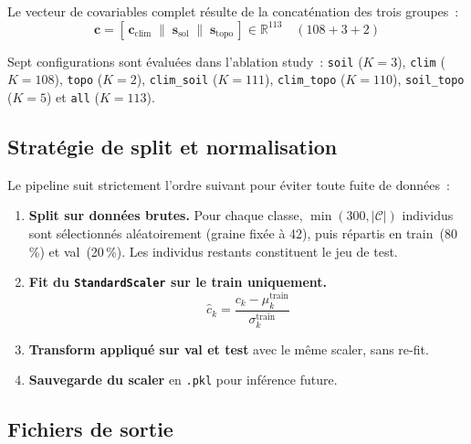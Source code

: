 Le vecteur de covariables complet résulte de la concaténation des trois groupes~:
\[
    \mathbf{c} = \left[\,\mathbf{c}_{\text{clim}} \;\|\; \mathbf{s}_{\text{sol}}
    \;\|\; \mathbf{s}_{\text{topo}}\,\right] \in \mathbb{R}^{113}
    \quad (108 + 3 + 2)
\]

Sept configurations sont évaluées dans l'ablation study~: \texttt{soil} ($K=3$),
\texttt{clim} ($K=108$), \texttt{topo} ($K=2$), \texttt{clim\_soil} ($K=111$),
\texttt{clim\_topo} ($K=110$), \texttt{soil\_topo} ($K=5$) et \texttt{all} ($K=113$).

\subsection{Stratégie de split et normalisation}
\label{sec:split_norm}

Le pipeline suit strictement l'ordre suivant pour éviter toute fuite de données~:

\begin{enumerate}
    \item \textbf{Split sur données brutes.} Pour chaque classe,
    $\min(300, |\mathcal{C}|)$ individus sont sélectionnés aléatoirement (graine fixée
    à 42), puis répartis en train~(80\,\%) et val~(20\,\%). Les individus restants
    constituent le jeu de test.
    \item \textbf{Fit du \texttt{StandardScaler} sur le train uniquement.}
    \[
        \hat{c}_k = \frac{c_k - \mu_k^{\text{train}}}{\sigma_k^{\text{train}}}
    \]
    \item \textbf{Transform appliqué sur val et test} avec le même scaler, sans re-fit.
    \item \textbf{Sauvegarde du scaler} en \texttt{.pkl} pour inférence future.
\end{enumerate}

\subsection{Fichiers de sortie}

